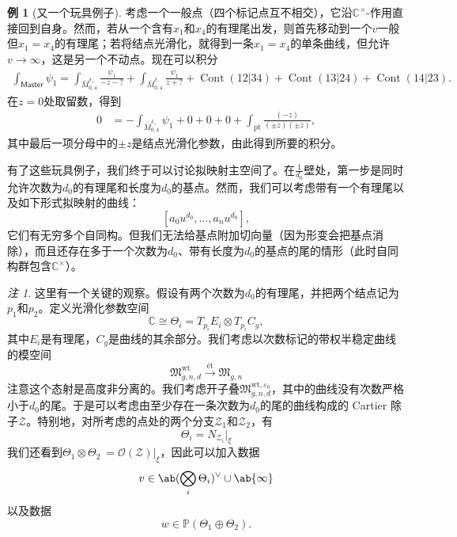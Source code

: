 \documentclass{amsart}
\theoremstyle{definition}
\newtheorem{exm}[thm]{例}
\theoremstyle{remark}
\newtheorem{rmk}[thm]{注}
\theoremstyle{plain}
\theoremstyle{definition}
\theoremstyle{remark}
\newcommand{\C}{\mathbb{C}}
\renewcommand{\P}{\mathbb{P}}
\newcommand{\ep}{\varepsilon}
\newcommand{\mc}[1]{\mathcal{#1}}
\newcommand{\mf}[1]{\mathfrak{#1}}
\newcommand{\mr}[1]{\mathrm{#1}}
\newcommand{\on}[1]{\operatorname{#1}}
\newcommand{\ms}[1]{\mathsf{#1}}
\newcommand{\1}{\mathbf{1}}
\newcommand{\2}{\mathbf{2}}
\newcommand{\3}{\mathbf{3}}
\begin{document}
\begin{exm}[又一个玩具例子]
    考虑一个一般点（四个标记点互不相交），它沿\(\C^{\times}\)-作用直接回到自身。然而，若从一个含有\(x_1\)和\(x_4\)的有理尾出发，则首先移动到一个\(v\)一般但\(x_1 = x_4\)的有理尾；若将结点光滑化，就得到一条\(x_1 = x_4\)的单条曲线，但允许\(v \to \infty\)，这是另一个不动点。现在可以积分
    \begin{align*}
        \int_{\ms{Master}} \psi_1 = \int_{\bar{M}_{0,4}^{\delta_+}} \frac{\psi_1}{-z-?} + \int_{\bar{M}_{0,4}^{\delta_-}} \frac{\psi_1}{z+?} + \on{Cont}(12|34) + \on{Cont}(13|24) + \on{Cont}(14|23).
    \end{align*}
    在\(z = 0\)处取留数，得到
    \begin{align*}
        0 &= - \int_{\bar{M}_{0,4}^{\delta_+}} \psi_1 + 0 + 0 + 0 + \int_{\mr{pt}} \frac{(-z)}{(\pm z)(\pm z)},
    \end{align*}
    其中最后一项分母中的\(\pm z\)是结点光滑化参数，由此得到所要的积分。
\end{exm}

有了这些玩具例子，我们终于可以讨论拟映射主空间了。在\(\frac{1}{d_0}\)壁处，第一步是同时允许次数为\(d_0\)的有理尾和长度为\(d_0\)的基点。然而，我们可以考虑带有一个有理尾以及如下形式拟映射的曲线：
\[ [a_0 u^{d_0}, \ldots, a_n u^{d_0}], \]
它们有无穷多个自同构。但我们无法给基点附加切向量（因为形变会把基点消除），而且还存在多于一个次数为\(d_0\)、带有长度为\(d_0\)的基点的尾的情形（此时自同构群包含\(\C^{\times}\)）。

\begin{rmk}
    这里有一个关键的观察。假设有两个次数为\(d_0\)的有理尾，并把两个结点记为\(p_1\)和\(p_2\)。定义光滑化参数空间
    \[ \C \cong \Theta_i = T_{p_i} E_i \otimes T_{p_i} C_g, \]
    其中\(E_i\)是有理尾，\(C_g\)是曲线的其余部分。我们考虑以次数标记的带权半稳定曲线的模空间
    \[ \mf{M}_{g,n,d}^{\mr{wt}} \xrightarrow{\text{\'et}} \mf{M}_{g,n} \]
    注意这个态射是高度非分离的。我们考虑开子叠\(\mf{M}_{g,n,d}^{\mr{wt}, \ep_0}\)，其中的曲线没有次数严格小于\(d_0\)的尾。于是可以考虑由至少存在一条次数为\(d_0\)的尾的曲线构成的 Cartier 除子\(\mc{Z}\)。特别地，对所考虑的点处的两个分支\(\mc{Z}_1\)和\(\mc{Z}_2\)，有
    \[ \Theta_i = N_{\mc{Z}_i} |_{\xi} \]
    我们还看到\(\Theta_1 \otimes \Theta_2\ = \mc{O}(\mc{Z})|_{\xi}\)，因此可以加入数据
    \[ v \in \ab(\bigotimes_i \Theta_i)^{\vee} \cup \ab\{\infty\} \]
    以及数据
    \[ w \in \P(\Theta_1 \oplus\Theta_2). \]
\end{rmk}
\end{document}
